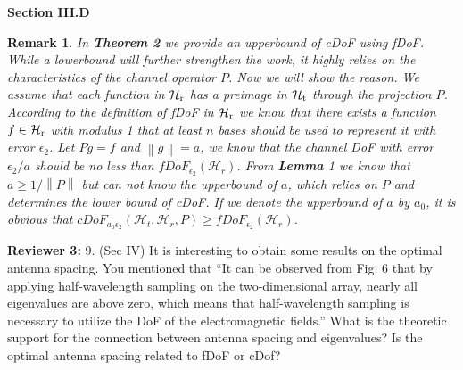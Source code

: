 \documentclass[a4paper,12pt]{article}
\newtheorem{remark}{\bf Remark}
\begin{document}
\begin{framed}
	{\bf Section III.D}
	
	{\color{red}
		\setcounter{remark}{2} 
		\begin{remark}
In {\bf Theorem 2} we provide an upperbound of cDoF using fDoF. While a lowerbound will further strengthen the work, it highly relies on the characteristics of the channel operator $P$. Now we will show the reason. We assume that each function in $\mathcal{H}_{\rm r}$ has a preimage in $\mathcal{H}_{\rm t}$ through the projection $P$. According to the definition of fDoF in $\mathcal{H}_{\rm r}$ we know that there exists a function $f\in \mathcal{H}_{\rm r}$ with modulus 1 that at least $n$ bases should be used to represent it with error $\epsilon_2$. Let $Pg = f$ and $\left\| g\right\| = a$, we know that the channel DoF with error $\epsilon_2/a$ should be no less than $fDoF_{\epsilon_2}(\mathcal{H}_r)$. From {\bf Lemma} 1 we know that $a \geqslant 1/\left\|  P \right\|$ but can not know the upperbound of $a$, which relies on $P$ and determines the lower bound of cDoF. If we denote the upperbound of $a$ by $a_0$, it is obvious that $cDoF_{a_0\epsilon_2}(\mathcal{H}_t,\mathcal{H}_r,P)\geqslant fDoF_{\epsilon_2}(\mathcal{H}_r)$. 

\end{remark}
}

\end{framed}

\textbf{Reviewer 3:}
9. (Sec IV) It is interesting to obtain some results on the optimal antenna spacing. You mentioned that “It can be observed from Fig. 6 that by applying half-wavelength sampling on the two-dimensional array, nearly all eigenvalues are above zero, which means that half-wavelength sampling is necessary to utilize the DoF of the electromagnetic fields.” What is the theoretic support for the connection between antenna spacing and eigenvalues? Is the optimal antenna spacing related to fDoF or cDof?
\end{document}
